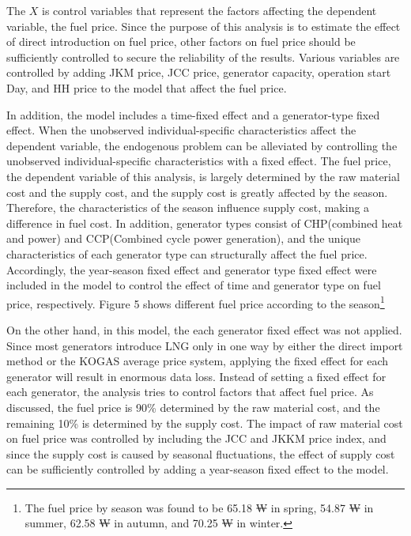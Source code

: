 \documentclass[12pt]{article}
\begin{document}
The {$X$} is control variables that represent the factors affecting the dependent variable, the fuel price. Since the purpose of this analysis is to estimate the effect of direct introduction on fuel price, other factors on fuel price should be sufficiently controlled to secure the reliability of the results. Various variables are controlled by adding JKM price, JCC price, generator capacity, operation start Day, and HH price to the model that affect the fuel price.


In addition, the model includes a time-fixed effect and a generator-type fixed effect. When the unobserved individual-specific characteristics affect the dependent variable, the endogenous problem can be alleviated by controlling the unobserved individual-specific characteristics with a fixed effect. The fuel price, the dependent variable of this analysis, is largely determined by the raw material cost and the supply cost, and the supply cost is greatly affected by the season. Therefore, the characteristics of the season influence supply cost, making a difference in fuel cost. In addition, generator types consist of CHP(combined heat and power) and CCP(Combined cycle power generation), and the unique characteristics of each generator type can structurally affect the fuel price. Accordingly, the year-season fixed effect and generator type fixed effect were included in the model to control the effect of time and generator type on fuel price, respectively. Figure 5 shows different fuel price according to the season\footnote{The fuel price by season was found to be 65.18 ₩ in spring, 54.87 ₩ in summer, 62.58 ₩ in autumn, and 70.25 ₩ in winter.}


On the other hand, in this model, the each generator fixed effect was not applied. Since most generators introduce LNG only in one way by either the direct import method or the KOGAS average price system, applying the fixed effect for each generator will result in enormous data loss. Instead of setting a fixed effect for each generator, the analysis tries to control factors that affect fuel price. As discussed, the fuel price is 90\% determined by the raw material cost, and the remaining 10\% is determined by the supply cost. The impact of raw material cost on fuel price was controlled by including the JCC and JKKM price index, and since the supply cost is caused by seasonal fluctuations, the effect of supply cost can be sufficiently controlled by adding a year-season fixed effect to the model.
\end{document}
